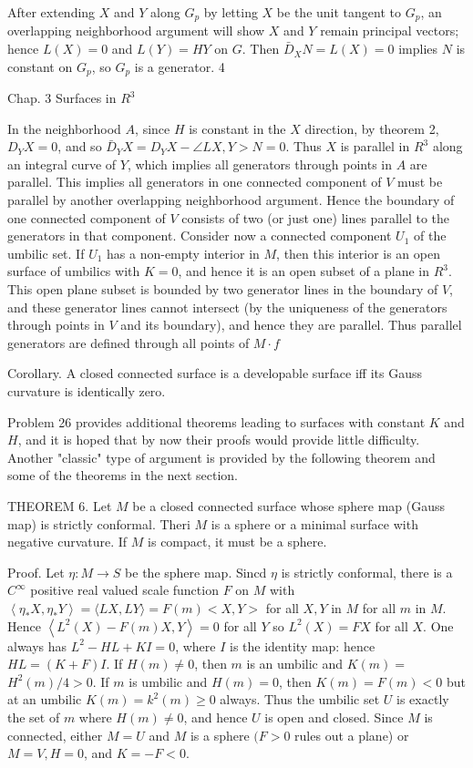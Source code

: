 \documentclass[10pt]{article}
\begin{document}
After extending $X$ and $Y$ along $G_{p}$ by letting $X$ be the unit tangent to $G_{p}$, an overlapping neighborhood argument will show $X$ and $Y$ remain principal vectors; hence $L(X)=0$ and $L(Y)=H Y$ on $G$. Then $\bar{D}_{X} N=L(X)=0$ implies $N$ is constant on $G_{p}$, so $G_{p}$ is a generator. 4

Chap. 3 Surfaces in $R^{3}$

In the neighborhood $A$, since $H$ is constant in the $X$ direction, by theorem 2, $D_{Y} X=0$, and so $\bar{D}_{Y} X=D_{Y} X-\angle L X, Y>N=0$. Thus $X$ is parallel in $R^{3}$ along an integral curve of $Y$, which implies all generators through points in $A$ are parallel. This implies all generators in one connected component of $V$ must be parallel by another overlapping neighborhood argument. Hence the boundary of one connected component of $V$ consists of two (or just one) lines parallel to the generators in that component. Consider now a connected component $U_{1}$ of the umbilic set. If $U_{1}$ has a non-empty interior in $M$, then this interior is an open surface of umbilics with $K=0$, and hence it is an open subset of a plane in $R^{3}$. This open plane subset is bounded by two generator lines in the boundary of $V$, and these generator lines cannot intersect (by the uniqueness of the generators through points in $V$ and its boundary), and hence they are parallel. Thus parallel generators are defined through all points of $M \cdot f$

Corollary. A closed connected surface is a developable surface iff its Gauss curvature is identically zero.

Problem 26 provides additional theorems leading to surfaces with constant $K$ and $H$, and it is hoped that by now their proofs would provide little difficulty. Another "classic" type of argument is provided by the following theorem and some of the theorems in the next section.

THEOREM 6. Let $M$ be a closed connected surface whose sphere map (Gauss map) is strictly conformal. Theri $M$ is a sphere or a minimal surface with negative curvature. If $M$ is compact, it must be a sphere.

Proof. Let $\eta: M \rightarrow S$ be the sphere map. Sincd $\eta$ is strictly conformal, there is a $C^{\infty}$ positive real valued scale function $F$ on $M$ with $\left\langle\eta_{*} X, \eta_{*} Y\right\rangle=\langle L X, L Y\rangle=F(m)<X, Y>$ for all $X, Y$ in $M$ for all $m$ in $M .$ Hence $\left\langle L^{2}(X)-F(m) X, Y\right\rangle=0$ for all $Y$ so $L^{2}(X)=F X$ for all $X$. One always has $L^{2}-H L+K I=0$, where $I$ is the identity map: hence $H L=(K+F) I$. If $H(m) \neq 0$, then $m$ is an umbilic and $K(m)=$ $H^{2}(m) / 4>0$. If $m$ is umbilic and $H(m)=0$, then $K(m)=F(m)<0$ but at an umbilic $K(m)=k^{2}(m) \geq 0$ always. Thus the umbilic set $U$ is exactly the set of $m$ where $H(m) \neq 0$, and hence $U$ is open and closed. Since $M$ is connected, either $M=U$ and $M$ is a sphere $(F>0$ rules out a plane) or $M=V, H=0$, and $K=-F<0$.
\end{document}
